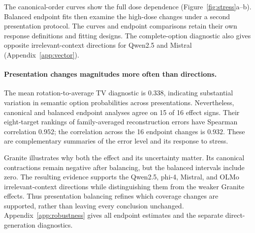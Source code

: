 The canonical-order curves show the full dose dependence (Figure~\ref{fig:stress}a--b). Balanced endpoint fits then examine the high-dose changes under a second presentation protocol. The curves and endpoint comparisons retain their own response definitions and fitting designs. The complete-option diagnostic also gives opposite irrelevant-context directions for Qwen2.5 and Mistral (Appendix~\ref{app:vector}).



\paragraph{Presentation changes magnitudes more often than directions.}
The mean rotation-to-average TV diagnostic is $0.338$, indicating substantial variation in semantic option probabilities across presentations. Nevertheless, canonical and balanced endpoint analyses agree on 15 of 16 effect signs. Their eight-target rankings of family-averaged reconstruction errors have Spearman correlation $0.952$; the correlation across the 16 endpoint changes is $0.932$. These are complementary summaries of the error level and its response to stress.

Granite illustrates why both the effect and its uncertainty matter. Its canonical contractions remain negative after balancing, but the balanced intervals include zero. The resulting evidence supports the Qwen2.5, phi-4, Mistral, and OLMo irrelevant-context directions while distinguishing them from the weaker Granite effects. Thus presentation balancing refines which coverage changes are supported, rather than leaving every conclusion unchanged. Appendix~\ref{app:robustness} gives all endpoint estimates and the separate direct-generation diagnostics.
